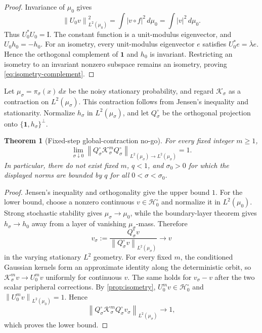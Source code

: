 \documentclass[11pt]{article}
\newtheorem{theorem}{Theorem}[section]
\theoremstyle{definition}
\theoremstyle{remark}
\newcommand{\Id}{\mathrm I}
\newcommand{\cH}{\mathcal H}
\newcommand{\cK}{\mathcal K}
\newcommand{\norm}[1]{\left\lVert #1\right\rVert}
\begin{document}
\begin{proof}
Invariance of \(\mu_0\) gives
\[
 \norm{U_0v}_{L^2(\mu_0)}^2
 =
 \int|v\circ f|^2\,d\mu_0
 =
 \int|v|^2\,d\mu_0.
\]
Thus \(U_0^*U_0=\Id\).  The constant function is a unit-modulus
eigenvector, and \(U_0h_0=-h_0\).  For an isometry, every unit-modulus
eigenvector \(e\) satisfies \(U_0^*e=\overline{\lambda}e\).  Hence the
orthogonal complement of \(\mathbf1\) and \(h_0\) is invariant.  Restricting
an isometry to an invariant nonzero subspace remains an isometry, proving
\eqref{eq:isometry-complement}.
\end{proof}

Let \(\mu_\sigma=\pi_\sigma(x)\,dx\) be the noisy stationary probability,
and regard \(\cK_\sigma\) as a contraction on \(L^2(\mu_\sigma)\).  This
contraction follows from Jensen's inequality and stationarity.  Normalize
\(h_\sigma\) in \(L^2(\mu_\sigma)\), and let \(Q_\sigma^\circ\) be the
orthogonal projection onto
\(\{\mathbf1,h_\sigma\}^{\perp}\).

\begin{theorem}[Fixed-step global-contraction no-go]
\label{thm:no-go}
For every fixed integer \(m\ge1\),
\begin{equation}
 \boxed{
 \lim_{\sigma\downarrow0}
 \norm{
 Q_\sigma^\circ\cK_\sigma^mQ_\sigma^\circ
 }_{L^2(\mu_\sigma)\to L^2(\mu_\sigma)}
 =1.}
 \label{eq:no-go}
\end{equation}
In particular, there do not exist fixed \(m\), \(q<1\), and
\(\sigma_0>0\) for which the displayed norms are bounded by \(q\) for all
\(0<\sigma<\sigma_0\).
\end{theorem}

\begin{proof}
Jensen's inequality and orthogonality give the upper bound \(1\).
For the lower bound, choose a nonzero continuous
\(v\in\cH_0^\circ\) and normalize it in \(L^2(\mu_0)\).  Strong stochastic
stability gives \(\mu_\sigma\to\mu_0\), while the boundary-layer theorem
gives \(h_\sigma\to h_0\) away from a layer of vanishing
\(\mu_\sigma\)-mass.  Therefore
\[
 v_\sigma
 :=
 \frac{Q_\sigma^\circ v}
 {\norm{Q_\sigma^\circ v}_{L^2(\mu_\sigma)}}
 \longrightarrow v
\]
in the varying stationary \(L^2\) geometry.  For every fixed \(m\), the
conditioned Gaussian kernels form an approximate identity along the
deterministic orbit, so
\(\cK_\sigma^mv\to U_0^mv\) uniformly for continuous \(v\).
The same holds for \(v_\sigma-v\) after the two scalar peripheral
corrections.  By \cref{prop:isometry},
\(U_0^mv\in\cH_0^\circ\) and
\(\norm{U_0^mv}_{L^2(\mu_0)}=1\).  Hence
\[
 \norm{
 Q_\sigma^\circ\cK_\sigma^mQ_\sigma^\circ v_\sigma
 }_{L^2(\mu_\sigma)}
 \longrightarrow1,
\]
which proves the lower bound.
\end{proof}
\end{document}
